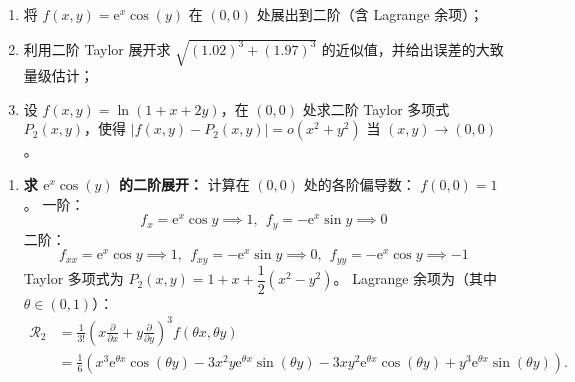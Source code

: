 \documentclass[lang=cn,11pt]{elegantbook}
\begin{document}
\begin{exercise}
\begin{enumerate}
  \item[(1)] 将 $f(x,y)=\mathrm{e}^{x}\cos(y)$ 在 $(0,0)$ 处展出到二阶（含 Lagrange 余项）；
  \item[(2)] 利用二阶 Taylor 展开求 $\sqrt{(1.02)^3+(1.97)^3}$ 的近似值，并给出误差的大致量级估计；
  \item[(3)] 设 $f(x,y)=\ln(1+x+2y)$，在 $(0,0)$ 处求二阶 Taylor 多项式 $P_2(x,y)$，使得 $|f(x,y)-P_2(x,y)|=o(x^2+y^2)$ 当 $(x,y)\to(0,0)$。
\end{enumerate}
\end{exercise}
\begin{solution}
\begin{enumerate}
  \item[(1)] \textbf{求 $\mathrm{e}^{x}\cos(y)$ 的二阶展开：}
  计算在 $(0,0)$ 处的各阶偏导数：
  $f(0,0) = 1$。
  一阶：\[f_x = \mathrm{e}^x\cos y \implies 1,~~f_y = -\mathrm{e}^x\sin y \implies 0\]
  二阶：\[f_{xx} = \mathrm{e}^x\cos y \implies 1,~~f_{xy} = -\mathrm{e}^x\sin y \implies 0,~~f_{yy} = -\mathrm{e}^x\cos y \implies -1\]
  Taylor 多项式为 $P_2(x,y) = 1 + x + \dfrac{1}{2}(x^2 - y^2)$。
  Lagrange 余项为（其中 $\theta \in (0,1)$）：
  \begin{align*}
  \mathcal{R}_2 &= \frac{1}{3!} \left( x\frac{\partial}{\partial x} + y\frac{\partial}{\partial y} \right)^3 f(\theta x, \theta y) \\
  &= \frac{1}{6} \left( x^3 \mathrm{e}^{\theta x}\cos(\theta y) - 3x^2y \mathrm{e}^{\theta x}\sin(\theta y) - 3xy^2 \mathrm{e}^{\theta x}\cos(\theta y) + y^3 \mathrm{e}^{\theta x}\sin(\theta y) \right).
  \end{align*}


\end{enumerate}
\end{solution}
\end{document}
